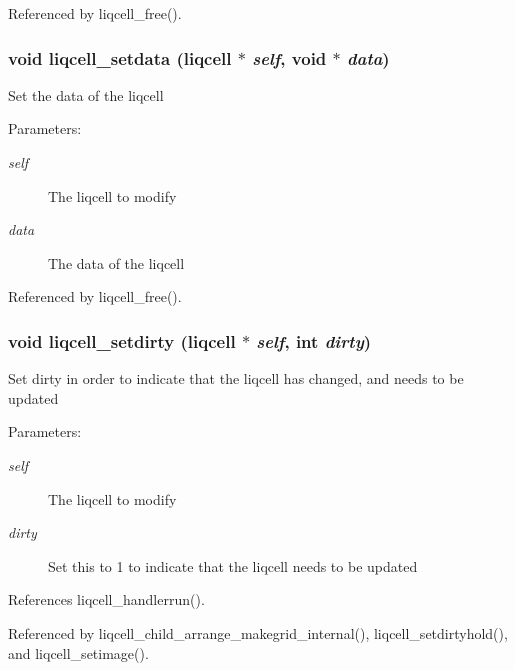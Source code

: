Referenced by liqcell\_\-free().
\subsubsection[{liqcell\_\-setdata}]{\setlength{\rightskip}{0pt plus 5cm}void liqcell\_\-setdata (liqcell $\ast$ {\em self}, \/  void $\ast$ {\em data})}\label{d5/da2/liqcell_8c_35b8154d56ab84d8073d5929ecec899e}


Set the data of the liqcell \begin{Desc}
\item[Parameters:]
\begin{description}
\item[{\em self}]The liqcell to modify \item[{\em data}]The data of the liqcell \end{description}
\end{Desc}


Referenced by liqcell\_\-free().
\subsubsection[{liqcell\_\-setdirty}]{\setlength{\rightskip}{0pt plus 5cm}void liqcell\_\-setdirty (liqcell $\ast$ {\em self}, \/  int {\em dirty})}\label{d5/da2/liqcell_8c_6b32b411a9291f4a98c29b9e23007ce5}


Set dirty in order to indicate that the liqcell has changed, and needs to be updated \begin{Desc}
\item[Parameters:]
\begin{description}
\item[{\em self}]The liqcell to modify \item[{\em dirty}]Set this to 1 to indicate that the liqcell needs to be updated \end{description}
\end{Desc}


References liqcell\_\-handlerrun().

Referenced by liqcell\_\-child\_\-arrange\_\-makegrid\_\-internal(), liqcell\_\-setdirtyhold(), and liqcell\_\-setimage().
